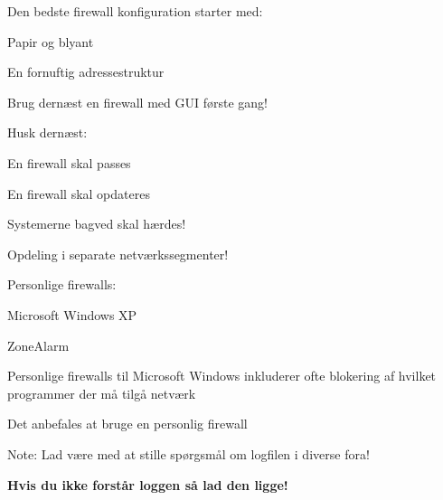\documentclass[Screen16to9,17pt]{foils}
\begin{document}

\begin{list1}
\item Den bedste firewall konfiguration starter med:
\begin{list2}
\item Papir og blyant
\item En fornuftig adressestruktur
\end{list2}
\item Brug dernæst en firewall med GUI første gang!
\item Husk dernæst:
\begin{list2}
\item En firewall skal passes
\item En firewall skal opdateres
\item Systemerne bagved skal hærdes!
\end{list2}
\end{list1}




\centerline{Opdeling i separate netværkssegmenter!}


\begin{list1}
\item Personlige firewalls:

\begin{list2}
\item Microsoft Windows XP
\item ZoneAlarm 
\end{list2}
\item Personlige firewalls til Microsoft Windows inkluderer ofte
blokering af hvilket programmer der må tilgå netværk
\end{list1}

\centerline{\color{titlecolor}Det anbefales at bruge en personlig firewall}

Note: Lad være med at stille spørgsmål om logfilen i diverse fora!

{\bfseries Hvis du ikke forstår loggen så lad den ligge!}




\end{document}
